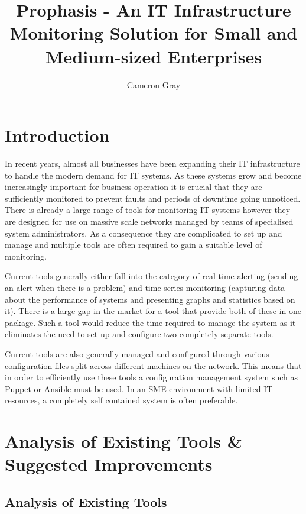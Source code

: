 \documentclass[bsc,deptreport,twoside,parskip,singlespacing,notimes]{infthesis}
\title{Prophasis - An IT Infrastructure Monitoring Solution for Small and Medium-sized Enterprises}
\author{Cameron Gray}
\begin{document}
\maketitle
\tableofcontents


\chapter{Introduction}
	In recent years, almost all businesses have been expanding their IT
	infrastructure to handle the modern demand for IT systems.  As these systems
	grow and become increasingly important for business operation it is crucial
	that they are sufficiently monitored to prevent faults and periods of downtime
	going unnoticed.  There is already a large range of tools for monitoring IT
	systems however they are  designed for use on massive scale networks managed by
	teams of specialised system administrators.  As a consequence they are
	complicated to set up and manage and multiple tools are often required to gain
	a suitable level of monitoring.


	Current tools generally either fall into the category of real time
	alerting (sending an alert when there is a problem) and time series
	monitoring (capturing data about the performance of systems and presenting
	graphs and statistics based on it). There is a large gap in the market for a
	tool that provide both of these in one package. Such a tool would reduce the
	time required to manage the system as it eliminates the need to set up and
	configure two completely separate tools.


	Current tools are also generally managed and configured through various
	configuration files split across different machines on the network. This means
	that in order to efficiently use these tools a configuration management system
	such as	Puppet or Ansible must be used. In an SME environment with limited IT
	resources, a completely self contained system is often preferable.

\chapter{Analysis of Existing Tools \& Suggested Improvements}
\section{Analysis of Existing Tools}
\label{analysis-of-existing-tools}
\end{document}
